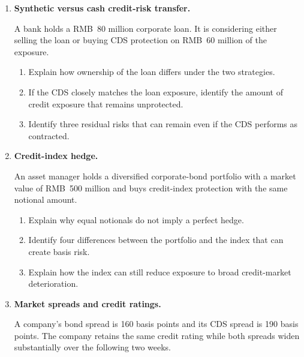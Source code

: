 \begin{enumerate}
\begin{enumerate}
\item Explain why this intensity need not equal the issuer's real-world annual default probability.

\end{enumerate}

\item \textbf{Synthetic versus cash credit-risk transfer.}

A bank holds a RMB~80 million corporate loan. It is considering either selling the loan or buying CDS protection on RMB~60 million of the exposure.

\begin{enumerate}

\item Explain how ownership of the loan differs under the two strategies.

\item If the CDS closely matches the loan exposure, identify the amount of credit exposure that remains unprotected.

\item Identify three residual risks that can remain even if the CDS performs as contracted.

\end{enumerate}

\item \textbf{Credit-index hedge.}

An asset manager holds a diversified corporate-bond portfolio with a market value of RMB~500 million and buys credit-index protection with the same notional amount.

\begin{enumerate}

\item Explain why equal notionals do not imply a perfect hedge.

\item Identify four differences between the portfolio and the index that can create basis risk.

\item Explain how the index can still reduce exposure to broad credit-market deterioration.

\end{enumerate}

\item \textbf{Market spreads and credit ratings.}

A company's bond spread is 160 basis points and its CDS spread is 190 basis points. The company retains the same credit rating while both spreads widen substantially over the following two weeks.


\end{enumerate}
